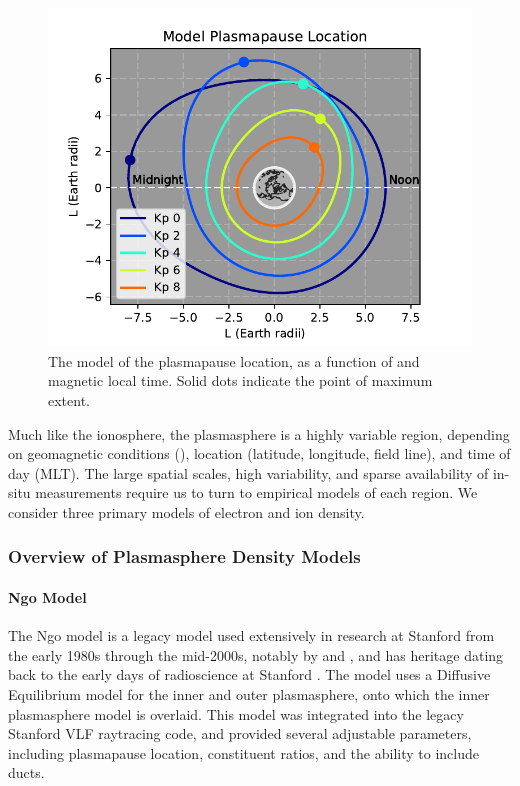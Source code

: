 \begin{figure}[h]
\begin{center}
\includegraphics{figures/plasmapause}
\caption[Model of plasmapause location]{The \cite{Gallagher1999} model of the plasmapause location, as a function of \kp{} and magnetic local time. Solid dots indicate the point of maximum extent.}
\label{fig:plasmapause}
\end{center}
\end{figure}


Much like the ionosphere, the plasmasphere is a highly variable region, depending on geomagnetic conditions (\kp{}), location (latitude, longitude, field line), and time of day (MLT). The large spatial scales, high variability, and sparse availability of in-situ measurements require us to turn to empirical models of each region. We consider three primary models of electron and ion density.

\subsubsection{Overview of Plasmasphere Density Models}
\label{section:plasmasphere_density_models}
\paragraph{Ngo Model}

The Ngo model is a legacy model used extensively in research at Stanford from the early 1980s through the mid-2000s, notably by \cite{Lauben1998} and \cite{Bortnik2005}, and has heritage dating back to the early days of radioscience at Stanford \citep{Kimura1966}. The model uses a Diffusive Equilibrium \citep[DE;][]{Angerami1964} model for the inner and outer plasmasphere, onto which the \cite{Carpenter1992} inner plasmasphere model is overlaid. This model was integrated into the legacy Stanford VLF raytracing code, and provided several adjustable parameters, including plasmapause location, constituent ratios, and the ability to include ducts.

